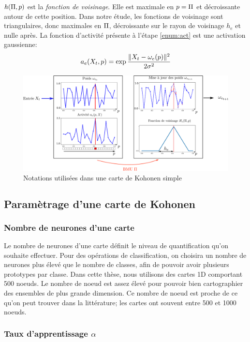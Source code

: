 $h(\Pi,p)$ est la \emph{fonction de voisinage}. Elle est maximale en $p = \Pi$ et décroissante autour de cette position. Dans notre étude, les fonctions de voisinage sont triangulaires, donc maximales en $\Pi$, décroissante sur le rayon de voisinage $h_e$ et nulle après.
La fonction d'activité présente à l'étape \ref{enum:act} est une activation gaussienne:
\begin{equation}\label{eq:act}
a_e(X_t,p) = \exp{\frac{\lVert X_t-\omega_{e}(p) \rVert ^2}{2\sigma^2}}
\end{equation}

\begin{figure}
\centering
\includegraphics[width=\textwidth]{one_map_one_layer2.pdf}
\caption{Notations utilisées dans une carte de Kohonen simple}
\label{fig:one_map_not}
\end{figure}

\subsection{Paramètrage d'une carte de Kohonen}
\subsubsection{Nombre de neurones d'une carte}
Le nombre de neurones d'une carte définit le niveau de quantification qu'on souhaite effectuer. Pour des opérations de classification, on choisira un nombre de neurones plus élevé que le nombre de classes, afin de pouvoir avoir plusieurs prototypes par classe.
Dans cette thèse, nous utilisons des cartes 1D comportant 500 noeuds. Le nombre de noeud est assez élevé pour pouvoir bien cartographier des ensembles de plus grande dimension. Ce nombre de noeud est proche de ce qu'on peut trouver dans la littérature; les cartes ont souvent entre 500 et 1000 noeuds.  

\subsubsection{Taux d'apprentissage $\alpha$}

